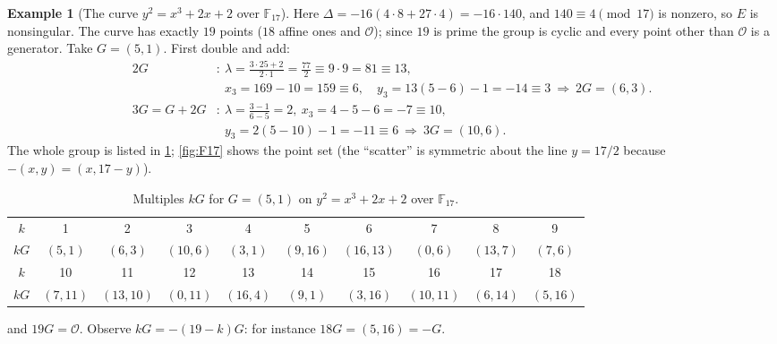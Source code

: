 \documentclass[11pt,a4paper,oneside]{book}
\theoremstyle{plain}
\theoremstyle{definition}
\newtheorem{example}[theorem]{Example}
\theoremstyle{remark}
\newcommand{\F}{\mathbb{F}}
\newcommand{\Oinf}{\mathcal{O}}
\begin{document}
\begin{example}[The curve $y^2=x^3+2x+2$ over $\F_{17}$]\label{ex:F17}
Here $\Delta=-16(4\cdot8+27\cdot4)=-16\cdot140$, and $140\equiv 4\pmod{17}$ is nonzero, so $E$ is nonsingular. The curve has exactly $19$ points ($18$ affine ones and $\Oinf$);
since $19$ is prime the group is cyclic and every point other than $\Oinf$ is a generator. Take $G=(5,1)$. First double and add:
\begin{align*}
2G&:\ \lambda=\tfrac{3\cdot25+2}{2\cdot1}=\tfrac{77}{2}\equiv 9\cdot9=81\equiv 13,\\
&\phantom{:\ }x_3=169-10=159\equiv6,\quad y_3=13(5-6)-1=-14\equiv 3\ \Rightarrow\ 2G=(6,3).\\
3G=G+2G&:\ \lambda=\tfrac{3-1}{6-5}=2,\ x_3=4-5-6=-7\equiv10,\\
&\phantom{:\ }y_3=2(5-10)-1=-11\equiv 6\ \Rightarrow\ 3G=(10,6).
\end{align*}
The whole group is listed in \cref{tab:F17multiples}; \cref{fig:F17} shows the point set (the ``scatter'' is symmetric about the line $y=17/2$ because $-(x,y)=(x,17-y)$).

\begin{table}[ht]
\centering
\caption{Multiples $kG$ for $G=(5,1)$ on $y^2=x^3+2x+2$ over $\F_{17}$.}\label{tab:F17multiples}
\small
\begin{tabular}{@{}cccccccccc@{}}
\toprule
$k$ & 1&2&3&4&5&6&7&8&9\\
$kG$ & $(5,1)$&$(6,3)$&$(10,6)$&$(3,1)$&$(9,16)$&$(16,13)$&$(0,6)$&$(13,7)$&$(7,6)$\\
\midrule
$k$ & 10&11&12&13&14&15&16&17&18\\
$kG$ & $(7,11)$&$(13,10)$&$(0,11)$&$(16,4)$&$(9,1)$&$(3,16)$&$(10,11)$&$(6,14)$&$(5,16)$\\
\bottomrule
\end{tabular}

\smallskip
and $19G=\Oinf$. Observe $kG=-(19-k)G$: for instance $18G=(5,16)=-G$.
\end{table}
\end{example}
\end{document}

